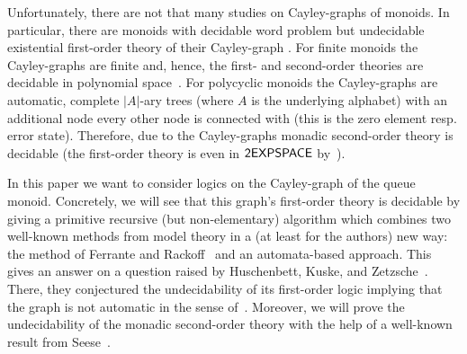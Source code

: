 Unfortunately, there are not that many studies on Cayley-graphs of monoids. In particular, there are monoids with decidable word problem but undecidable existential first-order theory of their Cayley-graph \cite{NarO90,KusL06}. For finite monoids the Cayley-graphs are finite and, hence, the first- and second-order theories are decidable in polynomial space~\cite{Graedel03}. For polycyclic monoids the Cayley-graphs are automatic, complete $|A|$-ary trees (where $A$ is the underlying alphabet) with an additional node every other node is connected with (this is the zero element resp. error state). Therefore, due to \cite{DelKT03,KusL06} the Cayley-graphs monadic second-order theory is decidable (the first-order theory is even in $\mathsf{2EXPSPACE}$ by~\cite{KusL11}).

In this paper we want to consider logics on the Cayley-graph of the queue monoid. Concretely, we will see that this graph's first-order theory is decidable by giving a primitive recursive (but non-elementary) algorithm which combines two well-known methods from model theory in a (at least for the authors) new way: the method of Ferrante and Rackoff~\cite{FerR79} and an automata-based approach. This gives an answer on a question raised by Huschenbett, Kuske, and Zetzsche~\cite{HusKZ17}. There, they conjectured the undecidability of its first-order logic implying that the graph is not automatic in the sense of~\cite{KN95}. Moreover, we will prove the undecidability of the monadic second-order theory with the help of a well-known result from Seese~\cite{See91}.